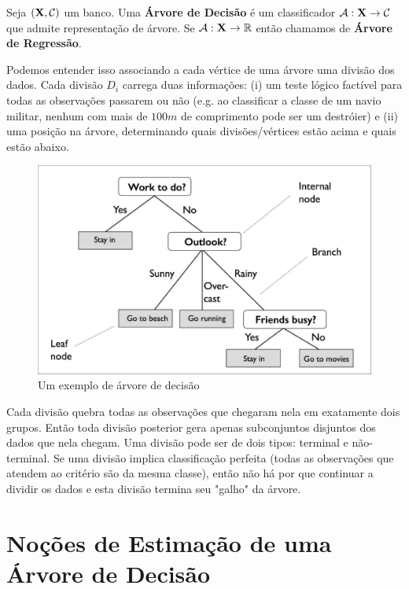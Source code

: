 \begin{defi}
Seja $(\mathbf{X}, \mathcal{C})$ um banco. Uma \textbf{Árvore de Decisão} é um classificador $\mathcal{A}: \mathbf{X} \to \mathcal{C}$ que admite representação de árvore. Se $\mathcal{A}: \mathbf{X} \to \mathbb{R}$ então chamamos de \textbf{Árvore de Regressão}.
\end{defi}

Podemos entender isso associando a cada vértice de uma árvore uma divisão dos dados. Cada divisão $D_i$ carrega duas informações: (i) um teste lógico factível para todas as observações passarem ou não (e.g. ao classificar a classe de um navio militar, nenhum com mais de $100m$ de comprimento pode ser um destróier) e (ii) uma posição na árvore, determinando quais divisões/vértices estão acima e quais estão abaixo.

\begin{figure}
    \centering
    \includegraphics[scale = .25]{imagens/arvore.png}
    \caption{Um exemplo de árvore de decisão}
    \label{fig:arvore}
\end{figure}

Cada divisão quebra todas as observações que chegaram nela em exatamente dois grupos. Então toda divisão posterior gera apenas subconjuntos disjuntos dos dados que nela chegam. Uma divisão pode ser de dois tipos: terminal e não-terminal. Se uma divisão implica classificação perfeita (todas as observações que atendem ao critério são da mesma classe), então não há por que continuar a dividir os dados e esta divisão termina seu "galho" da árvore. 


\section{Noções de Estimação de uma Árvore de Decisão}

